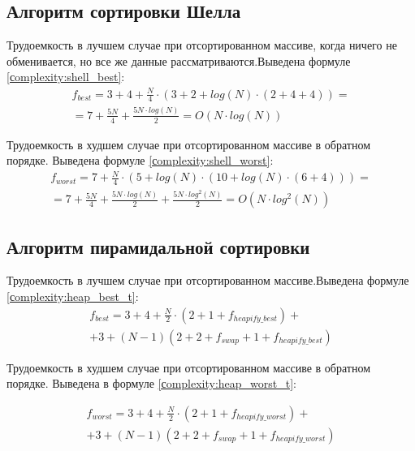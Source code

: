 \subsection{Алгоритм сортировки Шелла}

Трудоемкость в лучшем случае при отсортированном массиве, когда ничего не обменивается, но все же данные рассматриваются.Выведена формуле \ref{сomplexity:shell_best}:
\begin{equation}
	\label{сomplexity:shell_best}
	\begin{aligned}
		f_{best} = 3 + 4 + \frac{N}{4} \cdot (3 + 2 + log(N) \cdot (2 + 4 + 4)) = \\
		= 7 + \frac{5N}{4} + \frac{5N \cdot log(N)}{2} = O(N \cdot log(N))
	\end{aligned}
\end{equation}

Трудоемкость в худшем случае при отсортированном массиве в обратном порядке. Выведена формуле \ref{сomplexity:shell_worst}:
\begin{equation}
	\label{сomplexity:shell_worst}
	\begin{aligned}
		f_{worst} = 7 + \frac{N}{4} \cdot (5 + log(N) \cdot (10 + log(N) \cdot (6 + 4))) =\\
		= 7 + \frac{5N}{4} + \frac{5N \cdot log(N)}{2} + \frac{5N \cdot log^2(N)}{2} = O(N \cdot log^2(N))
\end{aligned}
\end{equation}

\subsection{Алгоритм пирамидальной сортировки}

Трудоемкость в лучшем случае при отсортированном массиве.Выведена формуле \ref{сomplexity:heap_best_t}:
\begin{equation}
	\label{сomplexity:heap_best_t}
	\begin{aligned}
		f_{best} = 3 + 4 + \frac{N}{2} \cdot (2 + 1 + f_{heapify\_best}) + \\
		+ 3 + (N - 1)(2 + 2 + f_{swap} + 1 + f_{heapify\_best})
	\end{aligned}
\end{equation}

Трудоемкость в худшем случае при отсортированном массиве в обратном порядке. Выведена в формуле \ref{сomplexity:heap_worst_t}:

\begin{equation}
	\label{сomplexity:heap_worst_t}
	\begin{aligned}
		f_{worst} = 3 + 4 + \frac{N}{2} \cdot (2 + 1 + f_{heapify\_worst}) + \\
		+ 3 + (N - 1)(2 + 2 + f_{swap} + 1 + f_{heapify\_worst})
	\end{aligned}
\end{equation}

